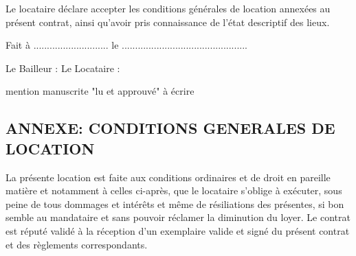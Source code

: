 \documentclass[a4paper,11pt]{article}
\begin{document}
\vspace{0.5cm}

Le locataire déclare accepter les conditions générales de location annexées au présent contrat, ainsi qu'avoir pris connaissance de l'état descriptif des lieux.

\vspace{0.5cm}

Fait à ............................ le ...............................................

\vspace{0.5cm}

Le Bailleur : \hspace{3cm}Le Locataire : 

\hspace{5.2cm}mention manuscrite "lu et approuvé" à écrire


\newpage{}




\begin{center}
\section*  { ANNEXE: CONDITIONS GENERALES  DE LOCATION}
\end{center}


\tiny



La présente location est faite aux conditions ordinaires et de droit en pareille matière et notamment à celles ci-après, que le locataire s’oblige à exécuter, sous peine de tous dommages et intérêts et même de résiliations des présentes, si bon semble au mandataire et sans pouvoir réclamer la diminution du loyer.
Le contrat est réputé validé à la réception d’un exemplaire valide et signé du présent contrat et des règlements correspondants.
\end{document}
